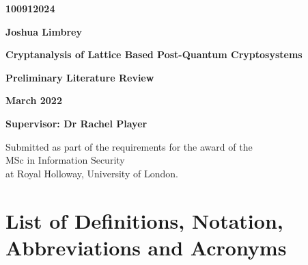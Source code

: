 \documentclass[a4paper, 10pt]{article}
\theoremstyle{definition}
\begin{document}
\begin{titlepage}
    \begin{center}
        \Large
        \textbf{100912024}

        \vspace{0.1cm}
        \textbf{Joshua Limbrey}

        \vspace{5cm}
        \LARGE
        \textbf{Cryptanalysis of Lattice Based Post-Quantum Cryptosystems}

        \vspace{0.1cm}
        \large
        \textbf{Preliminary Literature Review}

        \vspace{0.1cm}
        \textbf{March 2022}

        \vspace{1.5cm}
        \textbf{Supervisor: Dr Rachel Player}

        \vfill

        Submitted as part of the requirements for the award of the\\MSc in Information Security\\at Royal Holloway, University of London.


        \vspace{2.5cm}

    \end{center}
\end{titlepage}

\tableofcontents

\newpage

\section{List of Definitions, Notation, Abbreviations and Acronyms}
\begin{acronym}
\end{acronym}
\end{document}

